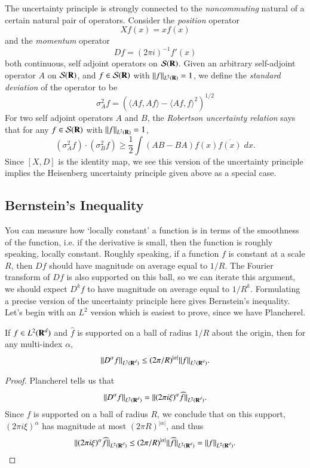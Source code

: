 The uncertainty principle is strongly connected to the \emph{noncommuting} natural of a certain natural pair of operators. Consider the \emph{position} operator
%
\[ Xf(x) = x f(x) \]
%
and the \emph{momentum} operator
%
\[ Df = (2 \pi i)^{-1} f'(x) \]
%
both continuous, self adjoint operators on $\mathcal{S}(\operatorname{\mathbf{R}})$. Given an arbitrary self-adjoint operator $A$ on $\mathcal{S}(\operatorname{\mathbf{R}})$, and $f \in \mathcal{S}(\operatorname{\mathbf{R}})$ with $\| f \|_{L^2(\operatorname{\mathbf{R}})} = 1$, we define the \emph{standard deviation} of the operator to be
%
\[ \sigma_A^2 f = \left( \langle Af, Af \rangle - \langle Af, f \rangle^2 \right)^{1/2} \]
%
%
For two self adjoint operators $A$ and $B$, the \emph{Robertson uncertainty relation} says that for any $f \in \mathcal{S}(\operatorname{\mathbf{R}})$ with $\| f \|_{L^2(\operatorname{\mathbf{R}})} = 1$,
%
\[ (\sigma_A^2 f) \cdot (\sigma_B^2 f) \geq \frac{1}{2} \int (AB - BA)f(x) \overline{f(x)}\; dx. \]
%
Since $[X,D]$ is the identity map, we see this version of the uncertainty principle implies the Heisenberg uncertainty principle given above as a special case.


\subsection{Bernstein's Inequality}

You can measure how `locally constant' a function is in terms of the smoothness of the function, i.e. if the derivative is small, then the function is roughly speaking, locally constant. Roughly speaking, if a function $f$ is constant at a scale $R$, then $Df$ should have magnitude on average equal to $1/R$. The Fourier transform of $Df$ is also supported on this ball, so we can iterate this argument, we should expect $D^kf$ to have magnitude on average equal to $1/R^k$. Formulating a precise version of the uncertainty principle here gives Bernstein's inequality. Let's begin with an $L^2$ version which is easiest to prove, since we have Plancherel.

\begin{lemma}
    If $f \in L^2(\operatorname{\mathbf{R}}^d)$ and $\widehat{f}$ is supported on a ball of radius $1/R$ about the origin, then for any multi-index $\alpha$,
    \[ \| D^\alpha f \|_{L^2(\operatorname{\mathbf{R}}^d)} \leq (2 \pi / R)^{|\alpha|} \| f \|_{L^2(\operatorname{\mathbf{R}}^d)}. \]
\end{lemma}
\begin{proof}
    Plancherel tells us that
    \[ \| D^\alpha f \|_{L^2(\operatorname{\mathbf{R}}^d)} = \| (2 \pi i \xi)^\alpha \widehat{f} \|_{L^2(\operatorname{\mathbf{R}}^d)}. \]
    Since $\widehat{f}$ is supported on a ball of radius $R$, we conclude that on this support, $(2 \pi i \xi)^\alpha$ has magnitude at most $(2 \pi R)^{|\alpha|}$, and thus
    \[ \| (2 \pi i \xi)^\alpha \widehat{f} \|_{L^2(\operatorname{\mathbf{R}}^d)} \leq (2 \pi / R)^{|\alpha|} \| \widehat{f} \|_{L^2(\operatorname{\mathbf{R}}^d)} = \| f \|_{L^2(\operatorname{\mathbf{R}}^d)}. \]
\end{proof}


